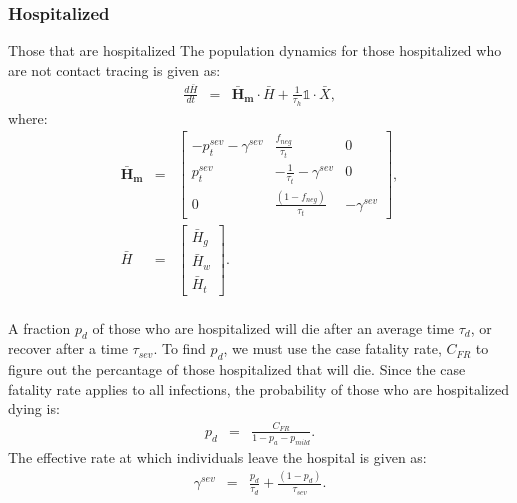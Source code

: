 \documentclass[notitlepage, superscriptaddress]{revtex4-2}
\begin{document}
\subsubsection{Hospitalized}
Those that are hospitalized 
The population dynamics for those hospitalized who are not contact tracing is given as:
\begin{eqnarray}
\frac{d\bar{H}}{dt} &=& \boldsymbol{\bar{H}_{m}} \cdot  \bar{H} + \frac{1}{\tau_{h}} \mathbb{1} \cdot  \bar{X}, 
\end{eqnarray}
%
where:
\begin{eqnarray}
\boldsymbol{\bar{H}_{m}} &=&
\begin{bmatrix}
- p^{sev}_{t} - \gamma^{sev}  &  \frac{f_{neg}}{\tau_{t}}            & 0 \\ 
 p^{sev}_{t}              & -\frac{1}{\tau_{t}} - \gamma^{sev}       & 0  \\ 
 0                  & \frac{(1- f_{neg})}{\tau_{t}}                        & -\gamma^{sev}
\end{bmatrix}, \\ 
%
\bar{H} &=& 
\begin{bmatrix}
\bar{H}_{g} \\ \bar{H}_{w}\\ \bar{H}_{t}
\end{bmatrix}. \\ 
%
\end{eqnarray}

A fraction $p_{d}$ of those who are hospitalized will die after an average time $\tau_{d}$, or recover after a time $\tau_{sev}$. To find $p_{d}$, we must use the case fatality rate, $C_{FR}$ to figure out the percantage of those hospitalized that will die. Since the case fatality rate applies to all infections, the probability of those who are hospitalized dying is:
\begin{eqnarray}
p_{d} &=& \frac{C_{FR}}{1- p_{a} - p_{mild}}.
\end{eqnarray}
The effective rate at which individuals leave the hospital is given as:
\begin{eqnarray}
\gamma^{sev} &=& \frac{p_{d}}{\tau_{d}} + \frac{(1-p_{d})}{\tau_{sev}}.
\end{eqnarray}
\end{document}
